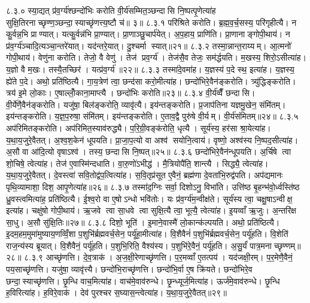 ८.३.०
स्या॒द्यत् प्र॑व॒र्ग्य॑श्छन्दो॑भिः करोति वी॒र्य॑सम्मित॒ञ्छन्दासि नि॒ष्पत्पृ॒णेत्या॑ह सुक्षि॒तिरनाच्छृण्ण॒ञ्छन्दा॒स्याच्छृ॑णत्त्य॒ष्टौ च॑॥ ३॥
८.३.१
परि॑श्रिते करोति। ब्र॒ह्म॒व॒र्च॒सस्य॒ परि॑गृहीत्यै। न कु॒र्वन्न॒भि प्राण्यात्। यत्कु॒र्वन्न॑भि प्रा॒ण्यात्। प्रा॒णाञ्छु॒चार्प॑येत्। अ॒प॒हाय॒ प्राणि॑ति। प्रा॒णानाङ्गोपी॒थाय॑। न प्र॑व॒र्ग्य॑ञ्चादि॒त्यञ्चा॒न्तरे॑यात्। यद॑न्तरे॒यात्। दु॒श्चर्मा स्यात्॥२१॥
८.३.२
तस्मा॒न्नान्त॒राय्यम्। आ॒त्मनो॑ गोपी॒थाय॑। वेणु॑ना करोति। तेजो॒ वै वेणु॑। तेज॑ प्रव॒र्ग्य॑। तेज॑सै॒व तेजः॒ सम॑र्द्धयति। म॒खस्य॒ शिरो॒ऽसीत्या॑ह। य॒ज्ञो वै म॒खः। तस्यै॒तच्छिर॑। यत्प्र॑व॒र्ग्य॑॥२२॥
८.३.३
तस्मा॑दे॒वमा॑ह। य॒ज्ञस्य॑ प॒दे स्थ॒ इत्या॑ह। य॒ज्ञस्य॒ ह्ये॑ते प॒दे। अथो॒ प्रति॑ष्ठित्यै। गा॒य॒त्रेण॑ त्वा॒ छन्द॑सा करो॒मीत्या॑ह। छन्दो॑भिरे॒वैन॑ङ्करोति। त्र्यु॑द्धिङ्करोति। त्रय॑ इ॒मे लो॒काः। ए॒षाल्लोँ॒काना॒माप्त्यै। छन्दो॑भिः करोति॥२३॥
८.३.४
वी॒र्य॑व्वैँ छन्दासि। वी॒र्ये॑णै॒वैन॑ङ्करोति। यजु॑षा॒ बिल॑ङ्करोति॒ व्यावृ॑त्यै। इय॑न्तङ्करोति। प्र॒जाप॑तिना यज्ञमु॒खेन॒ संमि॑तम्। इय॑न्तङ्करोति। य॒ज्ञ॒प॒रुषा॒ संमि॑तम्। इय॑न्तङ्करोति। ए॒ताव॒द्वै पुरु॑षे वी॒र्यम्। वी॒र्य॑संमितम्॥२४॥
८.३.५
अप॑रिमितङ्करोति। अप॑रिमित॒स्याव॑रुद्ध्यै। प॒रि॒ग्री॒वङ्क॑रोति॒ धृत्यै। सूर्य॑स्य॒ हर॑सा श्रा॒येत्या॑ह। य॒था॒य॒जुरे॒वैतत्। अ॒श्व॒श॒केन॑ धूपयति। प्रा॒जा॒प॒त्यो वा अश्व॑ सयोनि॒त्वाय॑। वृष्णो॒ अश्व॑स्य नि॒ष्पद॒सीत्या॑ह। अ॒सौ वा आ॑दि॒त्यो वृषाऽश्व॑। तस्य॒ छन्दासि नि॒ष्पत्॥२५॥
८.३.६
छन्दो॑भिरे॒वैन॑न्धूपयति। अ॒र्चिषे त्वा शो॒चिषे॒ त्वेत्या॑ह। तेज॑ ए॒वास्मि॑न्दधाति। वा॒रु॒णो॑ऽभीद्ध॑। मै॒त्रियोपै॑ति॒ शान्त्यै। सिद्ध्यै॒ त्वेत्या॑ह। य॒था॒य॒जुरे॒वैतत्। दे॒वस्त्वा॑ सवि॒तोद्व॑प॒त्वित्या॑ह। स॒वि॒तृप्र॑सूत ए॒वैनं॒ ब्रह्म॑णा दे॒वता॑भि॒रुद्व॑पति। अप॑द्यमानः पृथि॒व्यामाशा॒ दिश॒ आपृ॒णेत्या॑ह॥२६॥
८.३.७
तस्मा॑द॒ग्निः सर्वा॒ दिशोऽनु॒ विभा॑ति। उत्ति॑ष्ठ बृ॒हन्भ॑वो॒र्ध्वस्ति॑ष्ठ ध्रु॒वस्त्वमित्या॑ह॒ प्रति॑ष्ठित्यै। ई॒श्व॒रो वा ए॒षोऽन्धो भवि॑तोः। यः प्र॑व॒र्ग्य॑म॒न्वीक्ष॑ते। सूर्य॑स्य त्वा॒ चक्षु॒षाऽन्वीक्ष॒ इत्या॑ह। चक्षु॑षो गोपी॒थाय॑। ऋ॒जवे त्वा सा॒धवे त्वा सुक्षि॒त्यै त्वा॒ भूत्यै॒ त्वेत्या॑ह। इ॒यव्वाँ ऋ॒जुः। अ॒न्तरि॑क्ष सा॒धु। अ॒सौ सु॑क्षि॒तिः॥२७॥
८.३.८
दिशो॒ भूति॑। इ॒माने॒वास्मै॑ लो॒कान्क॑ल्पयति। अथो॒ प्रति॑ष्ठित्यै। इ॒दम॒हम॒मुमा॑मुष्याय॒णव्विँ॒शा प॒शुभि॑र्ब्रह्मवर्च॒सेन॒ पर्यू॑हा॒मीत्या॑ह। वि॒शैवैनं॑ प॒शुभि॑र्ब्रह्मवर्च॒सेन॒ पर्यू॑हति। वि॒शेति॑ राज॒न्य॑स्य ब्रूयात्। वि॒शैवैनं॒ पर्यू॑हति। प॒शुभि॒रिति॒ वैश्य॑स्य। प॒शुभि॑रे॒वैनं॒ पर्यू॑हति। अ॒सु॒र्यं॑ पात्र॒मनाच्छृण्णम्॥२८॥
८.३.९
आच्छृ॑णत्ति। दे॒व॒त्राक॑। अ॒ज॒क्षी॒रेणाच्छृ॑णत्ति। प॒र॒मव्वाँ ए॒तत्पय॑। यद॑जक्षी॒रम्। प॒र॒मेणै॒वैनं॒ पय॒साच्छृ॑णत्ति। यजु॑षा॒ व्यावृ॑त्त्यै। छन्दो॑भि॒राच्छृ॑णत्ति। छन्दो॑भि॒र्वा ए॒ष क्रि॑यते। छन्दो॑भिरे॒व छन्दा॒स्याच्छृ॑णत्ति। छृ॒न्धि वाच॒मित्या॑ह। वाच॑मे॒वाव॑रुन्धे। छृ॒न्ध्यूर्ज॒मित्या॑ह। ऊर्ज॑मे॒वाव॑रुन्धे। छृ॒न्धि ह॒विरित्या॑ह। ह॒विरे॒वाक॑। देव॑ पुरश्चर स॒घ्यास॒न्त्वेत्या॑ह। य॒था॒य॒जुरे॒वैतत्॥२९॥
\anuvakamend

